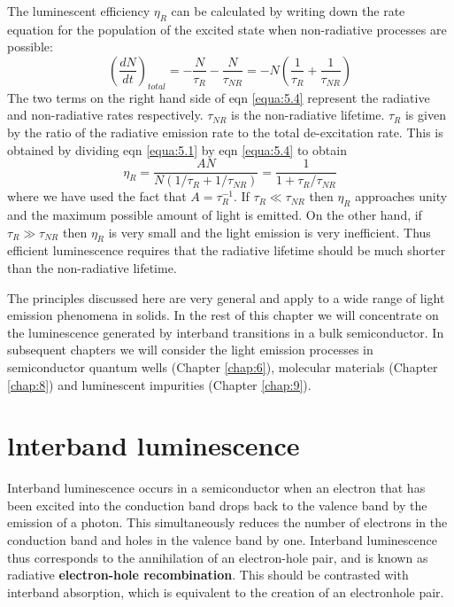 \documentclass[12pt]{book}
\begin{document}
The luminescent efficiency $\eta_R$ can be calculated by writing down the rate equation for the population of the excited state when non-radiative processes are possible:
\begin{equation}\label{equa:5.4}
  (\frac{dN}{dt})_{total}=-\frac{N}{\tau_R}-\frac{N}{\tau_{NR}}=-N(\frac{1}{\tau_R}+\frac{1}{\tau_{NR}})
\end{equation}
The two terms on the right hand side of eqn \ref{equa:5.4} represent the radiative and non-radiative rates respectively. $\tau_{NR}$ is the non-radiative lifetime. $\tau_{R}$ is given by the ratio of the radiative emission rate to the total de-excitation rate. This is obtained by dividing eqn \ref{equa:5.1} by eqn \ref{equa:5.4} to obtain
\begin{equation}\label{equa:5.5}
  \eta_R=\frac{AN}{N(1/\tau_R+1/\tau_{NR})}=\frac{1}{1+\tau_R/\tau_{NR}}
\end{equation}
where we have used the fact that $A = \tau_R^{-1}$. If $\tau_R \ll \tau_{NR}$ then $\eta_R$ approaches unity and the maximum possible amount of light is emitted. On the other hand, if $\tau_R \gg \tau_{NR}$ then $\eta_R$ is very small and the light emission is very inefficient. Thus efficient luminescence requires that the radiative lifetime should be much shorter than the non-radiative lifetime.

The principles discussed here are very general and apply to a wide range of light emission phenomena in solids. In the rest of this chapter we will concentrate on the luminescence generated by interband transitions in a bulk semiconductor. In subsequent chapters we will consider the light emission processes in semiconductor quantum wells (Chapter \ref{chap:6}), molecular materials (Chapter \ref{chap:8}) and luminescent impurities (Chapter \ref{chap:9}).

\section{lnterband luminescence}
Interband luminescence occurs in a semiconductor when an electron that has been excited into the conduction band drops back to the valence band by the emission of a photon. This simultaneously reduces the number of electrons in the conduction band and holes in the valence band by one. Interband luminescence thus corresponds to the annihilation of an electron-hole pair, and is known as radiative \textbf{electron-hole recombination}. This should be contrasted with interband absorption, which is equivalent to the creation of an electronhole pair.
\end{document}
